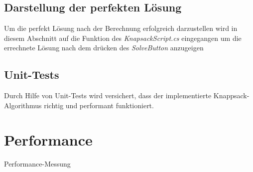\subsection{Darstellung der perfekten Lösung}
Um die perfekt Lösung nach der Berechnung erfolgreich darzustellen wird in diesem Abschnitt auf die  Funktion des
\textit{KnapsackScript.cs} eingegangen um die errechnete Lösung nach dem drücken des \textit{SolveButton} anzugeigen


\subsection{Unit-Tests}
Durch Hilfe von Unit-Tests wird versichert, dass der implementierte Knappsack-Algorithmus
richtig und performant funktioniert.

\section{Performance}
Performance-Messung
